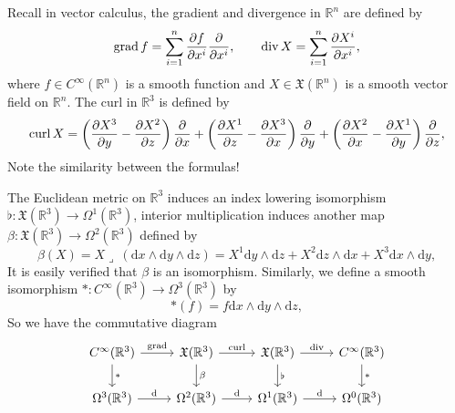 \documentclass[../main.tex]{subfiles}
\begin{document}
Recall in vector calculus, the gradient and divergence in $\mathbb{R}^n$ are defined by
\begin{equation*}
  \operatorname{grad} f = \sum_{i=1}^n \frac{\partial f}{\partial x^i} \frac{\partial }{\partial x^i}, \qquad \operatorname{div} X = \sum_{i=1}^n \frac{\partial X^i}{\partial x^i},
\end{equation*}
where $f\in C^\infty(\mathbb{R}^n)$ is a smooth function and $X \in \mathfrak{X}(\mathbb{R}^n)$ is a smooth vector field on $\mathbb{R}^n$. The curl in $\mathbb{R}^3$ is defined by
\begin{equation*}
  \operatorname{curl} X = \left(\frac{\partial X^3}{\partial y} - \frac{\partial X^2}{\partial z}\right) \frac{\partial }{\partial x} + \left(\frac{\partial X^1}{\partial z} - \frac{\partial X^3}{\partial x}\right) \frac{\partial }{\partial y} + \left(\frac{\partial X^2}{\partial x} - \frac{\partial X^1}{\partial y}\right) \frac{\partial }{\partial z},
\end{equation*}
Note the similarity between the formulas!

The Euclidean metric on $\mathbb{R}^3$ induces an index lowering isomorphism $\flat : \mathfrak{X}(\mathbb{R}^3) \to \Omega^1(\mathbb{R}^3)$, interior multiplication induces another map $\beta: \mathfrak{X}(\mathbb{R}^3) \to \Omega^2(\mathbb{R}^3)$ defined by
\begin{equation*}
  \beta(X) = X \lrcorner \ (\mathrm{d} x \wedge \mathrm{d} y \wedge \mathrm{d} z) = X^1 \mathrm{d} y \wedge \mathrm{d} z + X^2 \mathrm{d} z \wedge \mathrm{d} x + X^3 \mathrm{d} x \wedge \mathrm{d} y,
\end{equation*}
It is easily verified that $\beta$ is an isomorphism. Similarly, we define a smooth isomorphism $*: C^\infty(\mathbb{R}^3) \to \Omega^3(\mathbb{R}^3)$ by
\begin{equation*}
  *(f) = f \mathrm{d} x \wedge \mathrm{d} y \wedge \mathrm{d} z,
\end{equation*}
So we have the commutative diagram
\begin{equation}
  \begin{tikzcd}
    C^\infty(\mathbb{R}^3) \arrow[r, "\grad"] \arrow[d, "*"] & \mathfrak{X}(\mathbb{R}^3) \arrow[r, "\curl"] \arrow[d, "\beta"] & \mathfrak{X}(\mathbb{R}^3) \arrow[r, "\divergence"] \arrow[d, "\flat"] & C^\infty(\mathbb{R}^3) \arrow[d, "*"]\\
    \Omega^3(\mathbb{R}^3) \arrow[r, "\mathrm{d} "] & \Omega^2(\mathbb{R}^3) \arrow[r, "\mathrm{d} "] & \Omega^1(\mathbb{R}^3) \arrow[r, "\mathrm{d} "] & \Omega^0(\mathbb{R}^3)
  \end{tikzcd}
\end{equation}
\end{document}
